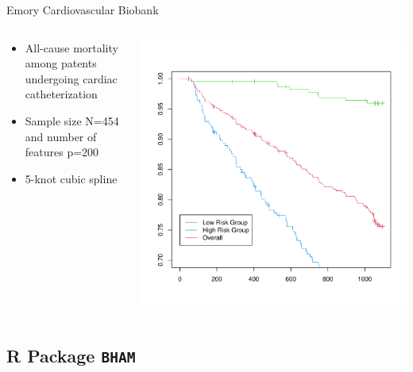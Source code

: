 \documentclass[
  ignorenonframetext,
  aspectratio=169]{beamer}
\providecommand{\tightlist}{%
  \setlength{\itemsep}{0pt}\setlength{\parskip}{0pt}}
\begin{document}
\begin{frame}{Emory Cardiovascular Biobank}
\protect\hypertarget{emory-cardiovascular-biobank-1}{}
\begin{columns}[T]
\begin{column}{0.48\textwidth}
\begin{itemize}
\tightlist
\item
  All-cause mortality among patents undergoing cardiac catheterization
\item
  Sample size N=454 and number of features p=200
\item
  5-knot cubic spline
\end{itemize}
\end{column}

\begin{column}{0.48\textwidth}
\includegraphics[width=\textwidth,height=0.6\textheight]{ECB_bcam_KM.pdf}
\end{column}
\end{columns}
\end{frame}

\hypertarget{r-package-bham}{%
\subsection{\texorpdfstring{R Package
\texttt{BHAM}}{R Package BHAM}}\label{r-package-bham}}
\end{document}
